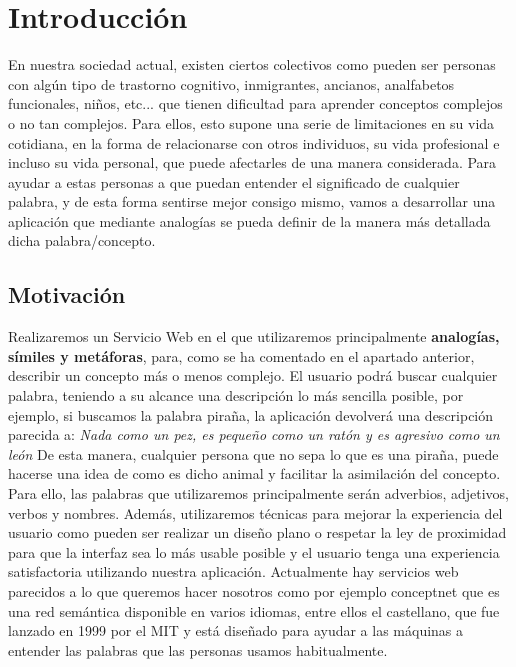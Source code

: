 \chapter{Introducción}
\label{cap:introduccion}


En nuestra sociedad actual, existen ciertos colectivos como pueden ser personas con algún tipo de trastorno cognitivo, inmigrantes, ancianos,  analfabetos funcionales, niños, etc... que tienen dificultad para aprender conceptos complejos o no tan complejos. Para ellos, esto supone una serie de limitaciones en su vida cotidiana, en la forma de relacionarse con otros individuos, su vida profesional e incluso su vida personal, que puede afectarles de una manera considerada.
Para ayudar a estas personas a que puedan entender el significado de cualquier palabra, y de esta forma sentirse mejor consigo mismo, vamos a desarrollar una aplicación que mediante analogías se pueda definir de la manera más detallada dicha palabra/concepto.

\section{Motivación}
Realizaremos un Servicio Web en el que utilizaremos principalmente \textbf{analogías, símiles y metáforas}, para, como se ha comentado en el apartado anterior, describir un concepto más o menos complejo. 
El usuario podrá buscar cualquier palabra, teniendo a su alcance una descripción lo más sencilla posible, por ejemplo, si buscamos la palabra piraña, la aplicación devolverá una descripción parecida a:
\textit{Nada como un pez, es pequeño como un ratón y es agresivo como un león}
De esta manera, cualquier persona que no sepa lo que es una piraña, puede  hacerse una idea de como es dicho animal y facilitar la asimilación del concepto.
Para ello, las palabras que utilizaremos principalmente serán adverbios, adjetivos, verbos y nombres.
Además, utilizaremos técnicas para mejorar la experiencia del usuario como pueden ser realizar un diseño plano o respetar la ley de proximidad para que la interfaz sea lo más usable posible y el usuario tenga una experiencia satisfactoria utilizando nuestra aplicación.
Actualmente hay servicios web parecidos a lo que queremos hacer nosotros como por ejemplo conceptnet que es una red semántica disponible en varios idiomas, entre ellos el castellano, que fue lanzado en 1999 por el MIT y está diseñado para ayudar a las máquinas a entender las palabras que las personas usamos habitualmente.



